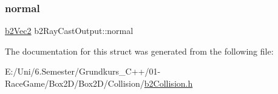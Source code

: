 \subsubsection{\texorpdfstring{normal}{normal}}
{\footnotesize\ttfamily \mbox{\hyperlink{structb2_vec2}{b2\+Vec2}} b2\+Ray\+Cast\+Output\+::normal}



The documentation for this struct was generated from the following file\+:\begin{DoxyCompactItemize}
\item 
E\+:/\+Uni/6.\+Semester/\+Grundkurs\+\_\+\+C++/01-\/\+Race\+Game/\+Box2\+D/\+Box2\+D/\+Collision/\mbox{\hyperlink{b2_collision_8h}{b2\+Collision.\+h}}\end{DoxyCompactItemize}

